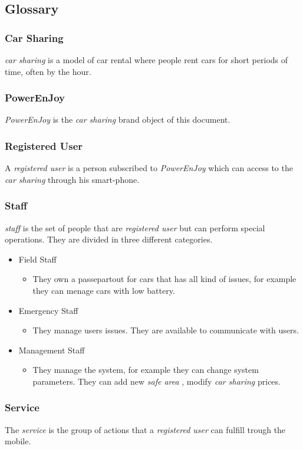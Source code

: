 \documentclass[english]{article}
\newcommand{\carsharing}{\textit {car sharing }}
\newcommand{\powerenjoy}{\textit{PowerEnJoy }}
\newcommand{\registereduser}{\textit {registered user }}
\newcommand{\staff}{\textit{staff }}
\newcommand{\service}{\textit{service }}
\newcommand{\safearea}{\textit{safe area }}
\begin{document}
	\subsection{Glossary}
		\subsubsection{Car Sharing}
			\carsharing is a model of car rental where people rent cars for short periods of time, often by the hour.
		\subsubsection{PowerEnJoy}
			\powerenjoy is the \carsharing brand object of this document. 
		\subsubsection{Registered User}
			A \registereduser is a person subscribed to \powerenjoy which can access to the \carsharing through his smart-phone.
		\subsubsection{Staff}
			\staff is the set of people that are \registereduser but can perform special operations. They are divided in three different categories.
			\begin{itemize}
				\item {Field Staff}
				\begin{itemize}
				\item They own a passepartout for cars that has all kind of issues, for example they can menage cars with low battery.
				\end{itemize}
				\item{Emergency Staff}
				\begin{itemize}
				\item They manage users issues. They are available to communicate with users.
				\end{itemize}
				\item{Management Staff}
				\begin{itemize}
				\item They manage the system, for example they can change system parameters. They can add new \safearea, modify \carsharing prices.
				\end{itemize}
			\end{itemize}
		\subsubsection{Service}
			The \service is the group of actions that a \registereduser can fulfill trough the mobile.	
\end{document}
